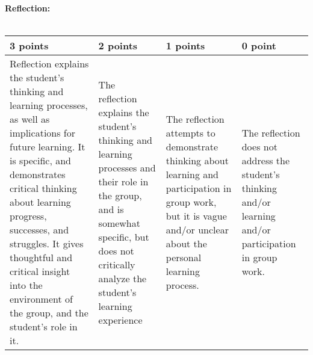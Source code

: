 \documentclass[12pt,landscape]{article}
\begin{document}
\bigskip
\bigskip
{\large \textbf{ Reflection:}}\\~\\
{\renewcommand{\arraystretch}{2}
\begin{tabular}{|p{5cm}|p{5cm}|p{5cm}|p{5cm}|}
\hline
 {\bf 3 points} & {\bf 2 points} & {\bf 1 points} & {\bf 0 point} \\
\hline
Reflection explains the student's thinking and learning processes, as well as implications for future learning. It is specific, and demonstrates critical thinking about learning progress, successes, and struggles. It gives thoughtful and critical insight into the environment of the group, and the student's role in it.& 
The reflection explains the student's thinking and learning processes and their role in the group, and is somewhat specific, but does not critically analyze the student's learning experience&
The reflection attempts to demonstrate thinking about learning and participation in group work, but it is vague and/or unclear about the personal learning process.&
The reflection does not address the student's thinking and/or learning and/or participation in group work.\\
\hline
 \end{tabular}
}
\end{document}
